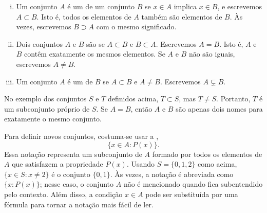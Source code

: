 \begin{myfigureht}
\caption{Diagrama dos conjuntos de exemplo $S$ e de seu subconjunto $T$.\label{fig:sets}}
\end{myfigureht}

\begin{defn}
\pagebreak[2]
\leavevmode
\begin{enumerate}[(i)]
\item
Um conjunto $A$ é um \emph{} de um conjunto $B$ se
$x \in A$ implica $x \in B$, e escrevemos $A \subset B$.
Isto é, todos os elementos de $A$ também são elementos de $B$. Às vezes,
escrevemos $B \supset A$ com o mesmo significado.
\item
Dois conjuntos $A$ e $B$ são \emph{} se
$A \subset B$ e $B \subset A$. Escrevemos $A = B$.
Isto é, $A$ e $B$ contêm exatamente os mesmos elementos.
Se $A$ e $B$ não são iguais, escrevemos $A \neq B$.
\item
Um conjunto $A$ é um \emph{} de $B$ se
$A \subset B$ e $A \neq B$. Escrevemos $A \subsetneq B$.
\end{enumerate}
\end{defn}

No exemplo dos conjuntos $S$ e $T$ definidos acima, $T \subset S$, mas
$T \neq S$. Portanto, $T$ é um
subconjunto próprio de $S$.
Se $A = B$, então $A$ e $B$ são apenas dois nomes para exatamente o mesmo
conjunto.

Para definir novos conjuntos, costuma-se usar a
\emph{},
\begin{equation*}
\bigl\{ x \in A : P(x) \bigr\} .
\end{equation*}
Essa notação representa um subconjunto de $A$ formado por todos os elementos
de $A$ que satisfazem a propriedade $P(x)$.
Usando $S = \{ 0, 1, 2 \}$ como acima, $\{ x \in S : x \neq 2 \}$
é o conjunto $\{ 0, 1 \}$.
Às vezes, a notação é abreviada como $\bigl\{ x : P(x) \bigr\}$; nesse caso,
o conjunto $A$ não é mencionado quando fica subentendido pelo contexto.
Além disso, a condição $x \in A$ pode ser substituída por uma fórmula para
tornar a notação mais fácil de ler.

